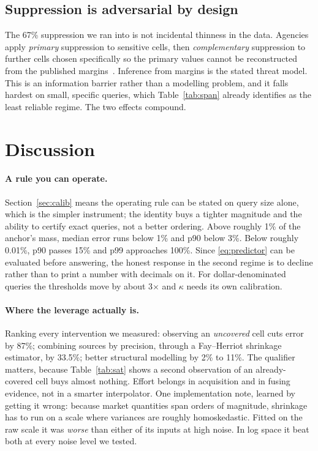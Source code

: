 \documentclass[11pt]{article}
\begin{document}
\subsection{Suppression is adversarial by design}

The 67\% suppression we ran into is not incidental thinness in the data.
Agencies apply \emph{primary} suppression to sensitive cells, then
\emph{complementary} suppression to further cells chosen specifically so the
primary values cannot be reconstructed from the published
margins~\cite{cellsuppression}. Inference from margins is the stated threat
model. This is an information barrier rather than a modelling problem, and it
falls hardest on small, specific queries, which Table~\ref{tab:span} already
identifies as the least reliable regime. The two effects compound.

\section{Discussion}

\paragraph{A rule you can operate.} Section~\ref{sec:calib} means the operating
rule can be stated on query size alone, which is the simpler instrument; the
identity buys a tighter magnitude and the ability to certify exact queries, not
a better ordering. Above roughly 1\% of the anchor's mass,
median error runs below 1\% and p90 below 3\%. Below roughly 0.01\%, p90 passes
15\% and p99 approaches 100\%. Since \eqref{eq:predictor} can be evaluated before
answering, the honest response in the second regime is to decline rather than to
print a number with decimals on it. For dollar-denominated queries the thresholds
move by about 3$\times$ and $\kappa$ needs its own calibration.

\paragraph{Where the leverage actually is.} Ranking every intervention we
measured: observing an \emph{uncovered} cell cuts error by 87\%; combining
sources by precision, through a Fay--Herriot shrinkage estimator, by 33.5\%;
better structural modelling by 2\% to 11\%. The qualifier matters, because
Table~\ref{tab:sat} shows a second observation of an already-covered cell buys
almost nothing. Effort belongs in acquisition and in fusing
evidence, not in a smarter interpolator. One implementation note, learned by
getting it wrong: because market quantities span orders of magnitude, shrinkage
has to run on a scale where variances are roughly homoskedastic. Fitted on the
raw scale it was \emph{worse} than either of its inputs at high noise. In log
space it beat both at every noise level we tested.
\end{document}
